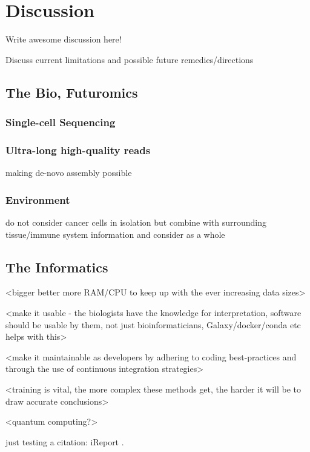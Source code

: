 \chapter{Discussion}
\label{discussion}
\setcounter{figure}{-1}
\setcounter{table}{-1}
\setcounter{section}{-1}

Write awesome discussion here!

Discuss current limitations and possible future remedies/directions

\section{The Bio, Futuromics}

\subsection{Single-cell Sequencing}

\subsection{Ultra-long high-quality reads}
making de-novo assembly possible

\subsection{Environment}
do not consider cancer cells in isolation but combine with surrounding tissue/immune system information and consider as a whole


\section{The Informatics}

<bigger better more RAM/CPU to keep up with the ever increasing data sizes>

<make it usable - the biologists have the knowledge for interpretation, software should be usable by them, not just bioinformaticians, Galaxy/docker/conda etc helps with this>

<make it maintainable as developers by adhering to coding best-practices and through the use of continuous integration strategies>

<training is vital, the more complex these methods get, the harder it will be to draw accurate conclusions>

<quantum computing?>

just testing a citation: iReport \cite{ireport}.



